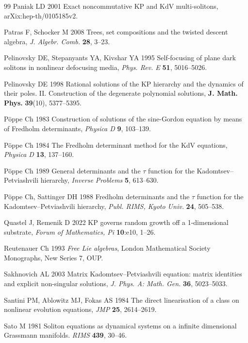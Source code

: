 \documentclass[5p,twocolumn]{elsarticle}
\begin{document}
\begin{thebibliography}{99}
 Paniak LD 2001 Exact noncommutative KP and KdV multi-solitons, arXix:hep-th/0105185v2.

 Patras F, Schocker M 2008 Trees, set compositions and the twisted descent algebra, \emph{J. Algebr. Comb.} \textbf{28}, 3--23. 
  
 Pelinovsky DE, Stepanyants YA, Kivshar YA 1995 Self-focusing of plane dark solitons in nonlinear defocusing media, \textit{Phys. Rev. E} \textbf{51}, 5016--5026. 

 Pelinovsky DE 1998 Rational solutions of the KP hierarchy and the dynamics of their poles. II. Construction of the degenerate polynomial solutions,
  \textbf{J. Math. Phys.\/} \textbf{39}(10), 5377--5395.
  
 P\"oppe Ch 1983 Construction of solutions of the sine-Gordon equation by means of Fredholm determinants, \textit{Physica D} \textbf{9}, 103--139.  
  
 P\"oppe Ch 1984 The Fredholm determinant method for the KdV equations, \textit{Physica D} \textbf{13}, 137--160.  
  
 P\"oppe Ch 1989 General determinants and the $\tau$ function for the Kadomtsev--Petviashvili hierarchy, \textit{Inverse Problems} \textbf{5}, 613--630.

 P\"oppe Ch, Sattinger DH 1988 Fredholm determinants and the $\tau$ function for the Kadomtsev--Petviashvili hierarchy, \textit{Publ. RIMS, Kyoto Univ.\/} \textbf{24}, 505--538.
  
 Quastel J, Remenik D 2022 KP governs random growth off a 1-dimensional substrate, \emph{Forum of Mathematics, Pi} \textbf{10}:e10, 1--26.

 Reutenauer Ch 1993 \textit{Free Lie algebras}, London Mathematical Society Monographs, New Series 7, OUP.
  
 Sakhnovich AL 2003 Matrix Kadomtsev--Petviashvili equation: matrix identities and explicit non-singular solutions, \textit{J. Phys. A: Math. Gen.} \textbf{36}, 5023--5033. 
  
 Santini PM, Ablowitz MJ, Fokas AS 1984 The direct linearisation of a class on nonlinear evolution equations, \textit{JMP} \textbf{25}, 2614--2619.  

 Sato M 1981 Soliton equations as dynamical systems on a infinite dimensional Grassmann manifolds. \textit{RIMS} \textbf{439}, 30--46.


\end{thebibliography}
\end{document}
